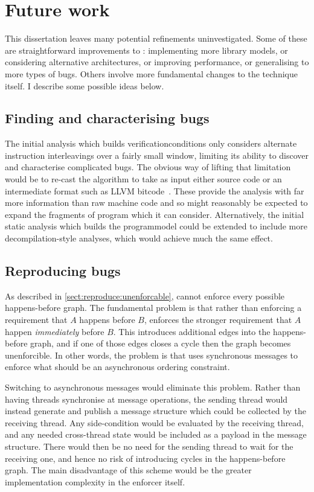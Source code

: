 \chapter{Future work}
\label{sect:fw}

This dissertation leaves many potential refinements uninvestigated.
Some of these are straightforward improvements to {\implementation}:
implementing more {\StateMachine} library models, or considering
alternative architectures, or improving performance, or generalising
to more types of bugs.  Others involve more fundamental changes to the
{\technique} technique itself.  I describe some possible ideas below.

\section{Finding and characterising bugs}

The initial analysis which builds \glspl{verificationcondition} only
considers alternate instruction interleavings over a fairly small
window, limiting its ability to discover and characterise complicated
bugs.  The obvious way of lifting that limitation would be to re-cast
the algorithm to take as input either source code or an intermediate
format such as LLVM bitcode~\cite{FFFLattner2013}.  These provide the
analysis with far more information than raw machine code and so might
reasonably be expected to expand the fragments of program which it can
consider.  Alternatively, the initial static analysis which builds the
\gls{programmodel} could be extended to include more
decompilation-style analyses, which would achieve much the same
effect.

\section{Reproducing bugs}

As described in \autoref{sect:reproduce:unenforcable}, {\technique}
cannot enforce every possible happens-before graph.  The fundamental
problem is that rather than enforcing a requirement that $A$ happens
before $B$, {\technique} enforces the stronger requirement that $A$
happen \emph{immediately} before $B$.  This introduces additional edges
into the happens-before graph, and if one of those edges closes a
cycle then the graph becomes unenforcible.  In other words, the
problem is that {\technique} uses synchronous messages to enforce what
should be an asynchronous ordering constraint.

Switching to asynchronous messages would eliminate this problem.
Rather than having threads synchronise at message operations, the
sending thread would instead generate and publish a message structure
which could be collected by the receiving thread.  Any side-condition
would be evaluated by the receiving thread, and any needed
cross-thread state would be included as a payload in the message
structure.  There would then be no need for the sending thread to wait
for the receiving one, and hence no risk of introducing cycles in the
happens-before graph.  The main disadvantage of this scheme would be
the greater implementation complexity in the enforcer itself.

